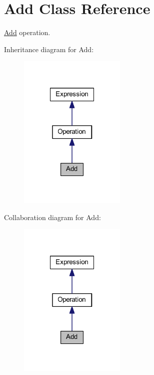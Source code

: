 \hypertarget{class_add}{\section{Add Class Reference}
\label{class_add}
}


\hyperlink{class_add}{Add} operation.  




Inheritance diagram for Add\-:\nopagebreak
\begin{figure}[H]
\begin{center}
\leavevmode
\includegraphics[width=144pt]{class_add__inherit__graph}
\end{center}
\end{figure}


Collaboration diagram for Add\-:\nopagebreak
\begin{figure}[H]
\begin{center}
\leavevmode
\includegraphics[width=144pt]{class_add__coll__graph}
\end{center}
\end{figure}
